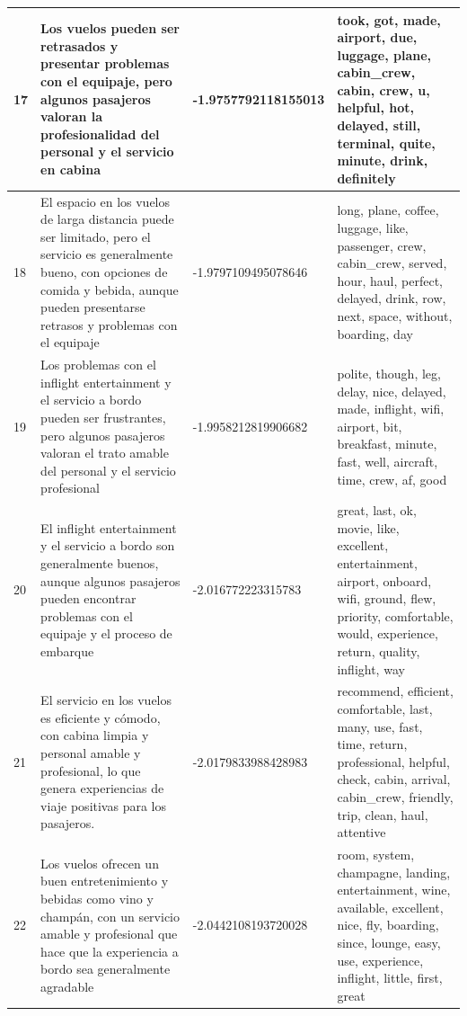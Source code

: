 \documentclass{report}
\begin{document}
{\begin{longtable}{|p{1cm}|p{4cm}|p{4cm}|p{6cm}|}
                    \hline
                    17 & Los vuelos pueden ser retrasados y presentar problemas con el equipaje, pero algunos pasajeros valoran la profesionalidad del personal y el servicio en cabina & -1.9757792118155013 & took, got, made, airport, due, luggage, plane, cabin\_crew, cabin, crew, u, helpful, hot, delayed, still, terminal, quite, minute, drink, definitely \\
                    \hline
                    18 & El espacio en los vuelos de larga distancia puede ser limitado, pero el servicio es generalmente bueno, con opciones de comida y bebida, aunque pueden presentarse retrasos y problemas con el equipaje & -1.9797109495078646 & long, plane, coffee, luggage, like, passenger, crew, cabin\_crew, served, hour, haul, perfect, delayed, drink, row, next, space, without, boarding, day \\
                    \hline
                    19 & Los problemas con el inflight entertainment y el servicio a bordo pueden ser frustrantes, pero algunos pasajeros valoran el trato amable del personal y el servicio profesional & -1.9958212819906682 & polite, though, leg, delay, nice, delayed, made, inflight, wifi, airport, bit, breakfast, minute, fast, well, aircraft, time, crew, af, good \\
                    \hline
                    20 & El inflight entertainment y el servicio a bordo son generalmente buenos, aunque algunos pasajeros pueden encontrar problemas con el equipaje y el proceso de embarque & -2.016772223315783 & great, last, ok, movie, like, excellent, entertainment, airport, onboard, wifi, ground, flew, priority, comfortable, would, experience, return, quality, inflight, way \\
                    \hline
                    21 & El servicio en los vuelos es eficiente y cómodo, con cabina limpia y personal amable y profesional, lo que genera experiencias de viaje positivas para los pasajeros. & -2.0179833988428983 & recommend, efficient, comfortable, last, many, use, fast, time, return, professional, helpful, check, cabin, arrival, cabin\_crew, friendly, trip, clean, haul, attentive \\
                    \hline
                    22 & Los vuelos ofrecen un buen entretenimiento y bebidas como vino y champán, con un servicio amable y profesional que hace que la experiencia a bordo sea generalmente agradable & -2.0442108193720028 & room, system, champagne, landing, entertainment, wine, available, excellent, nice, fly, boarding, since, lounge, easy, use, experience, inflight, little, first, great \\

\end{longtable}}
\end{document}
